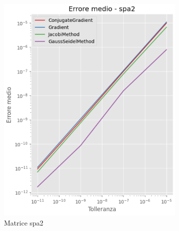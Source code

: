 \begin{figure}[!ht]
\begin{subfigure}{0.45\textwidth}
        \includegraphics[width=\textwidth]{./../report/Progetto_1_bis/img/error_spa2.png}
        \caption{Matrice spa2}
        \label{fig:error_spa2}
    \end{subfigure}
    \begin{subfigure}{0.45\textwidth}
        \centering

\end{subfigure}
\end{figure}
